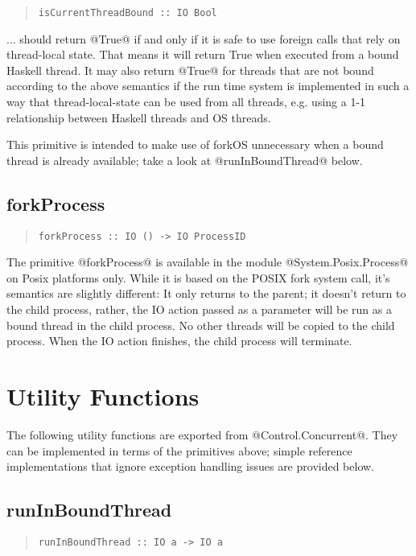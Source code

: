 \documentclass[a4paper,twoside]{article}
\begin{document}
\begin{quote}
\begin{verbatim}
isCurrentThreadBound :: IO Bool
\end{verbatim}
\end{quote}

... should return @True@ if and only if it is safe to use foreign calls that
rely on thread-local state. That means it will return True when executed from a
bound Haskell thread. It may also return @True@ for threads that are not bound
according to the above semantics if the run time system is implemented in such
a way that thread-local-state can be used from all threads, e.g. using a 1-1
relationship between Haskell threads and OS threads.

This primitive is intended to make use of forkOS unnecessary when a bound
thread is already available; take a look at @runInBoundThread@ below.

\subsection{forkProcess}

\begin{quote}
\begin{verbatim}
forkProcess :: IO () -> IO ProcessID
\end{verbatim}
\end{quote}

The primitive @forkProcess@ is available in the module @System.Posix.Process@
on Posix platforms only.
While it is based on the POSIX fork system call, it's semantics are slightly
different: It only returns to the parent; it doesn't return to the child process,
rather, the IO action passed as a parameter will be run as a bound thread in the
child process. No other threads will be copied to the child process. When the IO
action finishes, the child process will terminate.

\section{Utility Functions}

The following utility functions are exported from @Control.Concurrent@. They can
be implemented in terms of the primitives above; simple reference
implementations that ignore exception handling issues are provided below.

\subsection{runInBoundThread}
\begin{quote}
\begin{verbatim}
runInBoundThread :: IO a -> IO a
\end{verbatim}
\end{quote}
\end{document}
